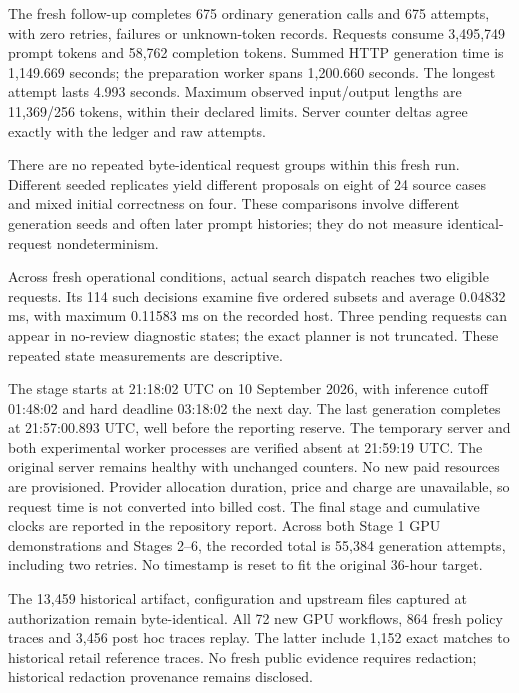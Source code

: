 The fresh follow-up completes 675 ordinary generation calls and 675 attempts, with zero retries, failures or unknown-token records. Requests consume 3,495,749 prompt tokens and 58,762 completion tokens. Summed HTTP generation time is 1,149.669 seconds; the preparation worker spans 1,200.660 seconds. The longest attempt lasts 4.993 seconds. Maximum observed input/output lengths are 11,369/256 tokens, within their declared limits. Server counter deltas agree exactly with the ledger and raw attempts.

There are no repeated byte-identical request groups within this fresh run. Different seeded replicates yield different proposals on eight of 24 source cases and mixed initial correctness on four. These comparisons involve different generation seeds and often later prompt histories; they do not measure identical-request nondeterminism.

Across fresh operational conditions, actual search dispatch reaches two eligible requests. Its 114 such decisions examine five ordered subsets and average 0.04832 ms, with maximum 0.11583 ms on the recorded host. Three pending requests can appear in no-review diagnostic states; the exact planner is not truncated. These repeated state measurements are descriptive.

The stage starts at 21:18:02 UTC on 10 September 2026, with inference cutoff 01:48:02 and hard deadline 03:18:02 the next day. The last generation completes at 21:57:00.893 UTC, well before the reporting reserve. The temporary server and both experimental worker processes are verified absent at 21:59:19 UTC. The original server remains healthy with unchanged counters. No new paid resources are provisioned. Provider allocation duration, price and charge are unavailable, so request time is not converted into billed cost. The final stage and cumulative clocks are reported in the repository report. Across both Stage 1 GPU demonstrations and Stages 2--6, the recorded total is 55,384 generation attempts, including two retries. No timestamp is reset to fit the original 36-hour target.

The 13,459 historical artifact, configuration and upstream files captured at authorization remain byte-identical. All 72 new GPU workflows, 864 fresh policy traces and 3,456 post hoc traces replay. The latter include 1,152 exact matches to historical retail reference traces. No fresh public evidence requires redaction; historical redaction provenance remains disclosed.
